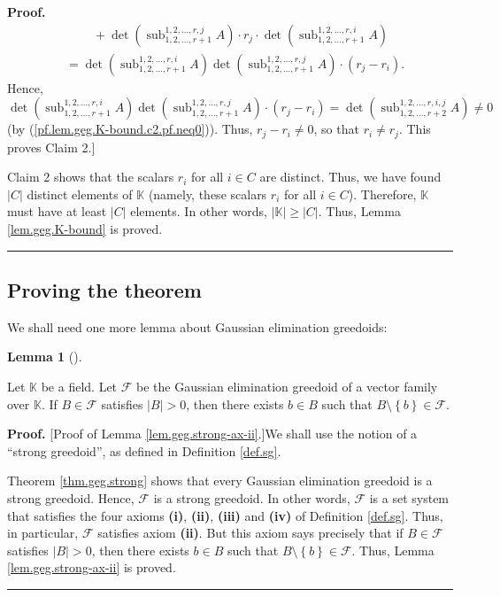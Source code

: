 \documentclass[numbers=enddot,12pt,final,onecolumn,notitlepage]{scrartcl}%
\theoremstyle{definition}
\newtheorem{lem}[theo]{Lemma}
\newenvironment{lemma}[1][]
{\begin{lem}[#1]\begin{leftbar}}
{\end{leftbar}\end{lem}}
\newenvironment{proof}[1][Proof]{\noindent\textbf{#1.} }{\ \rule{0.5em}{0.5em}}
\renewcommand{\geq}{\geqslant}
\theoremstyle{plainsl}
\begin{document}
\begin{proof}
\begin{align*}
&  \ \ \ \ \ \ \ \ \ \ +\det\left(  \operatorname*{sub}\nolimits_{1,2,\ldots
,r+1}^{1,2,\ldots,r,j}A\right)  \cdot r_{j}\cdot\det\left(
\operatorname*{sub}\nolimits_{1,2,\ldots,r+1}^{1,2,\ldots,r,i}A\right) \\
&  =\det\left(  \operatorname*{sub}\nolimits_{1,2,\ldots,r+1}^{1,2,\ldots
,r,i}A\right)  \det\left(  \operatorname*{sub}\nolimits_{1,2,\ldots
,r+1}^{1,2,\ldots,r,j}A\right)  \cdot\left(  r_{j}-r_{i}\right)  .
\end{align*}
Hence,%
\[
\det\left(  \operatorname*{sub}\nolimits_{1,2,\ldots,r+1}^{1,2,\ldots
,r,i}A\right)  \det\left(  \operatorname*{sub}\nolimits_{1,2,\ldots
,r+1}^{1,2,\ldots,r,j}A\right)  \cdot\left(  r_{j}-r_{i}\right)  =\det\left(
\operatorname*{sub}\nolimits_{1,2,\ldots,r+2}^{1,2,\ldots,r,i,j}A\right)
\neq0
\]
(by (\ref{pf.lem.geg.K-bound.c2.pf.neq0})). Thus, $r_{j}-r_{i}\neq0$, so that
$r_{i}\neq r_{j}$. This proves Claim 2.] \medskip

Claim 2 shows that the scalars $r_{i}$ for all $i\in C$ are distinct. Thus, we
have found $\left\vert C\right\vert $ distinct elements of $\mathbb{K}$
(namely, these scalars $r_{i}$ for all $i\in C$). Therefore, $\mathbb{K}$ must
have at least $\left\vert C\right\vert $ elements. In other words, $\left\vert
\mathbb{K}\right\vert \geq\left\vert C\right\vert $. Thus, Lemma
\ref{lem.geg.K-bound} is proved.
\end{proof}

\subsection{Proving the theorem}

We shall need one more lemma about Gaussian elimination greedoids:

\begin{lemma}
\label{lem.geg.strong-ax-ii}Let $\mathbb{K}$ be a field. Let $\mathcal{F}$ be
the Gaussian elimination greedoid of a vector family over $\mathbb{K}$. If
$B\in\mathcal{F}$ satisfies $\left\vert B\right\vert >0$, then there exists
$b\in B$ such that $B\setminus\left\{  b\right\}  \in\mathcal{F}$.
\end{lemma}

\begin{proof}
[Proof of Lemma \ref{lem.geg.strong-ax-ii}.]We shall use the notion of a
\textquotedblleft strong greedoid\textquotedblright, as defined in Definition
\ref{def.sg}.

Theorem \ref{thm.geg.strong} shows that every Gaussian elimination greedoid is
a strong greedoid. Hence, $\mathcal{F}$ is a strong greedoid. In other words,
$\mathcal{F}$ is a set system that satisfies the four axioms \textbf{(i)},
\textbf{(ii)}, \textbf{(iii)} and \textbf{(iv)} of Definition \ref{def.sg}.
Thus, in particular, $\mathcal{F}$ satisfies axiom \textbf{(ii)}. But this
axiom says precisely that if $B\in\mathcal{F}$ satisfies $\left\vert
B\right\vert >0$, then there exists $b\in B$ such that $B\setminus\left\{
b\right\}  \in\mathcal{F}$. Thus, Lemma \ref{lem.geg.strong-ax-ii} is proved.
\end{proof}
\end{document}
